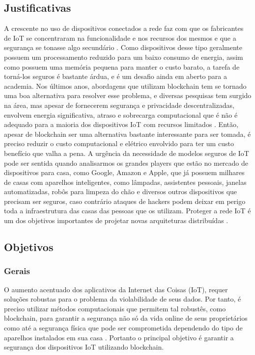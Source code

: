 \subsection{Justificativas}
	A crescente no uso de dispositivos conectados a rede faz com que os fabricantes de IoT se concentraram na funcionalidade e nos recursos dos mesmos e que a segurança se tonasse algo secundário \cite{falco2019neuromesh}. Como dispositivos desse tipo geralmente possuem um processamento reduzido para um baixo consumo de energia, assim como possuem uma memória pequena para manter o custo barato, a tarefa de torná-los seguros é bastante árdua, e é um desafio ainda em aberto para a academia. Nos últimos anos, abordagens que utilizam blockchain tem se tornado uma boa alternativa para resolver esse problema, e diversas pesquisas tem surgido na área, mas apesar de fornecerem segurança e privacidade descentralizadas, envolvem energia significativa, atraso e sobrecarga computacional que é não é adequado para a maioria dos dispositivos IoT com recursos limitados \cite{dorri2017blockchain}. Então, apesar de blockchain ser uma alternativa bastante interessante para ser tomada, é preciso reduzir o custo computacional e elétrico envolvido para ter um custo benefício que valha a pena. A urgência da necessidade de modelos seguros de IoT pode ser sentida quando analisarmos os grandes players que estão no mercado de dispositivos para casa, como Google, Amazon e Apple, que já possuem milhares de casas com aparelhos inteligentes, como lâmpadas, assistentes pessoais, janelas automatizadas, robôs para limpeza do chão e diversos outros dispositivos que precisam ser seguros, caso contrário ataques de hackers podem deixar em perigo toda a infraestrutura das casas das pessoas que os utilizam. Proteger a rede IoT é um dos objetivos importantes de projetar novas arquiteturas distribuídas \cite{sharma2018software}.

\subsection{Objetivos}
\subsubsection{Gerais}
	O aumento acentuado dos aplicativos da Internet das Coisas (IoT), requer soluções robustas para o problema da violabilidade de seus dados. Por tanto, é preciso utilizar métodos computacionais que permitem tal robustês, como blockchain, para garantir a segurança não só da vida online de seus proprietários como até a segurança física que pode ser comprometida dependendo do tipo de aparelhos instalados em sua casa \cite{dorri2017towards}. Portanto o principal objetivo é garantir a segurança dos dispositivos IoT utilizando blockchain.


